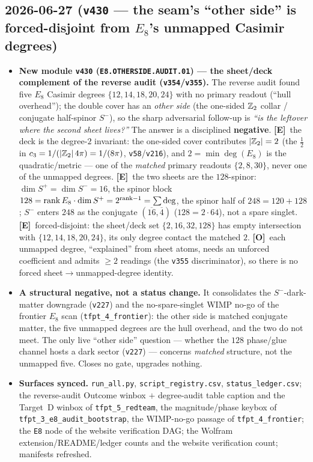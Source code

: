 \documentclass[11pt]{article}
\providecommand{\mE}{\textbf{[E]}}\providecommand{\mC}{\textbf{[C]}}
\providecommand{\mO}{\textbf{[O]}}\providecommand{\mX}{\textbf{[X]}}
\providecommand{\vref}[1]{\texttt{#1}}
\providecommand{\cthree}{c_3}\providecommand{\phiz}{\varphi_0^{\mathrm{ret}}}
\begin{document}
\subsection*{2026-06-27 (\texttt{v430} --- the seam's ``other side'' is forced-disjoint from $E_8$'s unmapped Casimir degrees)}
\begin{itemize}
\item \textbf{New module \texttt{v430} (\texttt{E8.OTHERSIDE.AUDIT.01}) --- the sheet/deck complement of the
reverse audit (\vref{v354}/\vref{v355}).} The reverse audit found five $E_8$ Casimir degrees
$\{12,14,18,20,24\}$ with no primary readout (``hull overhead''); the double cover has an \emph{other side}
(the one-sided $\mathbb{Z}_2$ collar / conjugate half-spinor $S^-$), so the sharp adversarial follow-up is
\emph{``is the leftover where the second sheet lives?''} The answer is a disciplined \textbf{negative}.
\mE\ the deck is the degree-$2$ invariant: the one-sided cover contributes $|\mathbb{Z}_2|=2$ (the $\tfrac12$ in
$\cthree=1/(|\Z_2|\,4\pi)=1/(8\pi)$, \vref{v58}/\vref{v216}), and $2=\min\deg(E_8)$ is the quadratic/metric ---
one of the \emph{matched} primary readouts $\{2,8,30\}$, never one of the unmapped degrees.
\mE\ the two sheets are the $128$-spinor: $\dim S^+{=}\dim S^-{=}16$, the spinor block
$128={\rm rank}\,E_8\cdot\dim S^+=2^{{\rm rank}-1}=\sum\deg$, the spinor half of $248=120+128$; $S^-$ enters
$248$ as the conjugate $(\overline{16},\overline4)$ ($128=2\cdot64$), not a spare singlet.
\mE\ forced-disjoint: the sheet/deck set $\{2,16,32,128\}$ has empty intersection with $\{12,14,18,20,24\}$,
its only degree contact the matched $2$. \mO\ each unmapped degree, ``explained'' from sheet atoms, needs an
unforced coefficient and admits $\ge2$ readings (the \vref{v355} discriminator), so there is no forced
sheet$\to$unmapped-degree identity.
\item \textbf{A structural negative, not a status change.} It consolidates the $S^-$-dark-matter downgrade
(\vref{v227}) and the no-spare-singlet WIMP no-go of the frontier $E_8$ scan (\texttt{tfpt\_4\_frontier}): the
other side is matched conjugate matter, the five unmapped degrees are the hull overhead, and the two do not
meet. The only live ``other side'' question --- whether the $128$ phase/glue channel hosts a dark sector
(\vref{v227}) --- concerns \emph{matched} structure, not the unmapped five. Closes no gate, upgrades nothing.
\item \textbf{Surfaces synced.} \texttt{run\_all.py}, \texttt{script\_registry.csv},
\texttt{status\_ledger.csv}; the reverse-audit Outcome winbox $+$ degree-audit table caption and the Target~D
winbox of \texttt{tfpt\_5\_redteam}, the magnitude/phase keybox of \texttt{tfpt\_3\_e8\_audit\_bootstrap}, the
WIMP-no-go passage of \texttt{tfpt\_4\_frontier}; the \texttt{E8} node of the website verification DAG; the
Wolfram extension/README/ledger counts and the website verification count; manifests refreshed.
\end{itemize}
\end{document}
